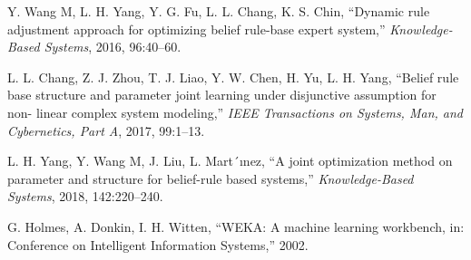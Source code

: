 \documentclass{ieeeaccess}
\begin{document}
\begin{thebibliography}{00}
     Y. Wang M, L. H. Yang, Y. G. Fu, L. L. Chang, K. S. Chin, ``Dynamic rule adjustment approach for optimizing belief rule-base expert system,''
    \emph{Knowledge-Based Systems}, 2016, 96:40–60.

     L. L. Chang, Z. J. Zhou, T. J. Liao, Y. W. Chen, H. Yu, L. H. Yang, ``Belief rule base structure and parameter joint learning under disjunctive assumption for non- linear complex system modeling,''
    \emph{IEEE Transactions on Systems, Man, and Cybernetics, Part A}, 2017, 99:1–13.

     L. H. Yang, Y. Wang M, J. Liu, L. Mart´ınez, ``A joint optimization method on parameter and structure for belief-rule based systems,''
    \emph{Knowledge-Based Systems}, 2018, 142:220–240.

     G. Holmes, A. Donkin, I. H. Witten, ``WEKA: A machine learning workbench,
    in: Conference on Intelligent Information Systems,'' 2002.

\end{thebibliography}
\end{document}
